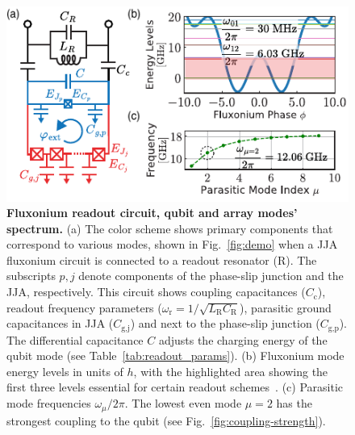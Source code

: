 \documentclass[%
reprint,
superscriptaddress,
 amsmath,amssymb,
 aps,
 prx,
longbibliography,
floatfix,
]{revtex4-2}
\begin{document}
\begin{figure}[t]
\centering    
\includegraphics[width=\linewidth]{Figures/Meas_Circuit.pdf}
\caption{{\bf Fluxonium readout circuit, qubit and array modes' spectrum.} (a) The color scheme shows primary components that correspond to various modes, shown in Fig.~\ref{fig:demo} when a JJA fluxonium circuit is connected to a readout resonator (R). The subscripts $p,j$ denote components of the phase-slip junction and the JJA, respectively. This circuit shows coupling capacitances ($C_\textrm{c}$), readout frequency parameters ($\omega_\textrm{r}=1/\sqrt{L_\textrm{R}C_\textrm{R}}$), parasitic ground capacitances in JJA ($C_\textrm{g,j}$) and next to the phase-slip junction ($C_\textrm{g,p}$). The differential capacitance $C$ adjusts the charging energy of the qubit mode (see Table~\ref{tab:readout_params}). (b) Fluxonium mode energy levels in units of $h$, with the highlighted area showing the first three levels essential for certain readout schemes~\cite{zhang_universal_2021}. (c) Parasitic mode frequencies $\omega_\mu/2\pi$. The lowest even mode $\mu = 2$ has the strongest coupling to the qubit (see Fig.~\ref{fig:coupling-strength}). 
}
\label{fig:meas_circuit}
\end{figure}
\end{document}
